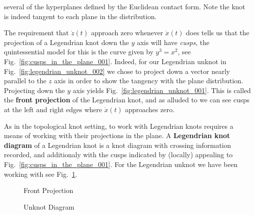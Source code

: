     several of the hyperplanes defined by the Euclidean contact form. Note the
    knot is indeed tangent to each plane in the distribution.
    \par\hfill\par
    The requirement that $\dot{z}(t)$ approach zero whenever $\dot{x}(t)$ does
    tells us that the projection of a Legendrian knot down the $y$ axis will
    have \textit{cusps}, the quintessential model for this is the curve given
    by $y^{3}=x^{2}$, see Fig.~\ref{fig:cusps_in_the_plane_001}.
    Indeed, for our Legendrian unknot in Fig.~\ref{fig:legendrian_unknot_002}
    we chose to project down a vector nearly parallel to the $z$ axis in order
    to show the tangency with the plane distribution. Projecting down the
    $y$ axis yields Fig.~\ref{fig:legendrian_unknot_001}. This is called the
    \textbf{front projection} of the Legendrian knot, and as alluded to we can
    see cusps at the left and right edges where $\dot{x}(t)$ approaches zero.
    \par\hfill\par
    As in the topological knot setting, to work with Legendrian knots requires
    a means of working with their projections in the plane. A
    \textbf{Legendrian knot diagram} of a Legendrian knot is a knot diagram
    with crossing information recorded, and additionaly with the cusps indicated
    by (locally) appealing to Fig.~\ref{fig:cusps_in_the_plane_001}. For
    the Legendrian unknot we have been working with see
    Fig.~\ref{fig:legendrian_unknot_cusps_001}.
    \begin{figure}
        \centering
        \begin{minipage}[b]{0.49\textwidth}
            \caption[Front Projection of the Legendrian Unknot]
                {Front Projection}
            \label{fig:legendrian_unknot_001}
        \end{minipage}
        \hfill
        \begin{minipage}[b]{0.49\textwidth}
            \centering
            \caption[Legendrian Unknot Diagram]
                {Unknot Diagram}
            \label{fig:legendrian_unknot_cusps_001}
        \end{minipage}
    \end{figure}
